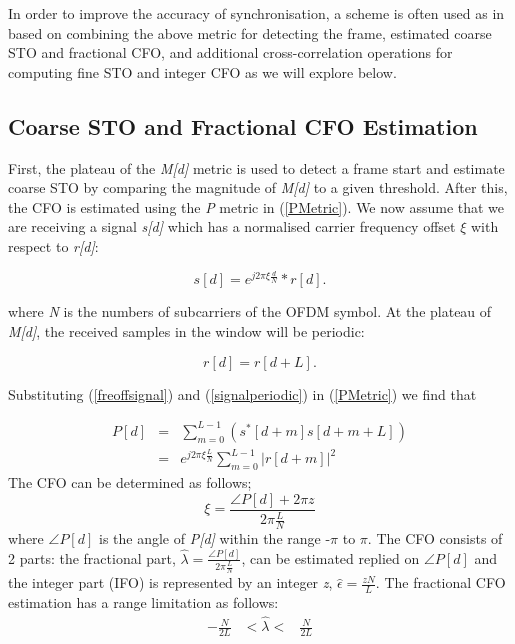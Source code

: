 In order to improve the accuracy of synchronisation, a scheme is often used as in \cite{Schwoerer2002,Manavi2004,Guffey2007,Huang2010,Recio2010} based on combining the above metric for detecting the frame, estimated coarse STO and fractional CFO, and additional cross-correlation operations for computing fine STO and integer CFO as we will explore below. 

\subsection{Coarse STO and Fractional CFO Estimation}

First, the plateau of the \emph{M[d]} metric is used to detect a frame start and estimate coarse STO by comparing the magnitude of \emph{M[d]} to a given threshold. After this, the CFO is estimated using the \emph{P} metric in (\ref{PMetric}). 
We now assume that we are receiving a signal \emph{s[d]} which has a normalised carrier frequency offset $\xi$ with respect to \emph{r[d]}: 
\begin{center}
\begin{equation}
\label{freoffsignal}
s[d] =  e^{j2\pi\xi \frac{d}{N}}*r[d].
\end{equation}
\end{center} 
where \emph{N} is the numbers of subcarriers of the OFDM symbol. At the plateau of \emph{M[d]}, the received samples in the window will be periodic:  
\begin{center}
\begin{equation}
\label{signalperiodic}
r[d] =  r[d+L].
\end{equation}
\end{center} 

Substituting (\ref{freoffsignal}) and  (\ref{signalperiodic}) in (\ref{PMetric}) we find that

\begin{eqnarray}
\label{PMetricfreoffset}
P[d] &=& \sum_{m =0}^{L-1}  (s^{*}[d+m] s[d+m+L] ) \nonumber \\
 &=& e^{j2\pi \xi \frac{L}{N}} \sum_{m =0}^{L-1}  |r[d+m]|^2 
\end{eqnarray}
The CFO can be determined as follows;
\begin{equation}
\label{fractionalCFO}
\xi = \frac{\angle P[d] + 2\pi z}{2\pi \frac{L}{N}}
\end{equation}
where  $\angle P[d]$ is the angle of \emph{P[d]} within the range -$\pi$ to $\pi$. 
The CFO consists of 2 parts: the fractional part, $\hat{\lambda} = \frac{\angle P[d]}{2\pi \frac{L}{N}}$, can be estimated replied on $\angle P[d]$ and the integer part (IFO) is represented by an integer \emph{z}, $\hat{\epsilon} = \frac{z N}{L}$.
The fractional CFO estimation has a range limitation as follows:
\begin{eqnarray}
\label{fractionalCFOlimitation}
 -\frac{N}{2L} & <  \hat{\lambda}   < & \frac{N}{2L}
\end{eqnarray}

